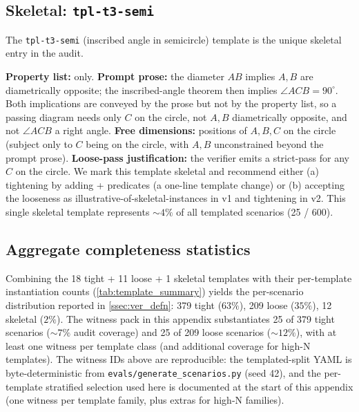 \subsection{Skeletal: \texttt{tpl-t3-semi}}
\label{app:completeness_witnesses:skeletal}

The \texttt{tpl-t3-semi} (inscribed angle in semicircle) template is the unique skeletal entry in the audit.

\textbf{Property list:}  only.
\textbf{Prompt prose:} the diameter $AB$ implies $A,B$ are diametrically opposite; the inscribed-angle theorem then implies $\angle ACB = 90^\circ$. Both implications are conveyed by the prose but not by the property list, so a passing diagram needs only $C$ on the circle, not $A,B$ diametrically opposite, and not $\angle ACB$ a right angle.
\textbf{Free dimensions:} positions of $A, B, C$ on the circle (subject only to $C$ being on the circle, with $A, B$ unconstrained beyond the prompt prose).
\textbf{Loose-pass justification:} the verifier emits a strict-pass for any $C$ on the circle. We mark this template skeletal and recommend either (a) tightening by adding  +  predicates (a one-line template change) or (b) accepting the looseness as illustrative-of-skeletal-instances in v1 and tightening in v2.
This single skeletal template represents $\sim 4\%$ of all templated scenarios (25 / 600).

\subsection{Aggregate completeness statistics}

Combining the 18 tight + 11 loose + 1 skeletal templates with their per-template instantiation counts (\cref{tab:template_summary}) yields the per-scenario distribution reported in \cref{ssec:ver_defn}: 379 tight ($63\%$), 209 loose ($35\%$), 12 skeletal ($2\%$).
The witness pack in this appendix substantiates 25 of 379 tight scenarios ($\sim 7\%$ audit coverage) and 25 of 209 loose scenarios ($\sim 12\%$), with at least one witness per template class (and additional coverage for high-N templates).
The witness IDs above are reproducible: the templated-split YAML is byte-deterministic from \texttt{evals/generate\_scenarios.py} (seed 42), and the per-template stratified selection used here is documented at the start of this appendix (one witness per template family, plus extras for high-N families).
